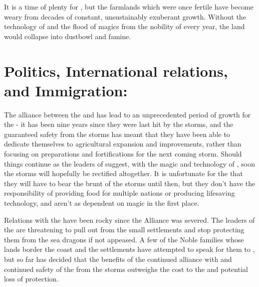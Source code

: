 \documentclass[blue]{GL2020}
\begin{document}
It is a time of plenty for \pFarmers{}, but the farmlands which were once fertile have become weary from decades of constant, unsustainably exuberant growth.  Without the technology of \pTech{} and the flood of magics from the nobility of \pFarm{} every year, the land would collapse into dustbowl and famine.

\section*{Politics, International relations, and Immigration:}

The alliance between the \pFarm{} and \pTech{} has lead to an unprecedented period of growth for the \pFarmers{} - it has been nine years since they were last hit by the storms, and the guaranteed safety from the storms has meant that they have been able to dedicate themselves to agricultural expansion and improvements, rather than focusing on preparations and fortifications for the next coming storm.  Should things continue as the leaders of \pTech{} suggest, with the magic and technology of \pTech{}, soon the storms will hopefully be rectified altogether.  It is unfortunate for the \pShip{} that they will have to bear the brunt of the storms until then, but they don't have the responsibility of providing food for multiple nations or producing lifesaving technology, and aren't as dependent on magic in the first place.

Relations with the \pShip{} have been rocky since the Alliance was severed.  The leaders of the \pShip{} are threatening to pull out from the small settlements and stop protecting them from the sea dragons if not appeased.  A few of the Noble families whose lands border the coast and the \pShip{} settlements have attempted to speak for them to \cQueen{}, but so far \cQueen{\they} has decided that the benefits of the continued alliance with \pTechies{} and continued safety of the \pFarm{} from the storms outweighs the cost to the \pShip{} and potential loss of protection.

\end{document}
